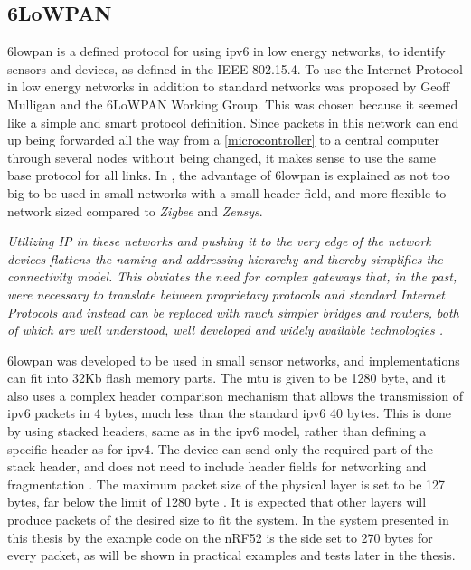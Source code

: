 
\subsection{6LoWPAN}

\gls{6lowpan} is a defined protocol for using \gls{ipv6} in low energy networks, to identify sensors and devices, as defined in the IEEE 802.15.4. To use the Internet Protocol in low energy networks in addition to standard networks was proposed by Geoff Mulligan and the 6LoWPAN Working Group. This was chosen because it seemed like a simple and smart protocol definition. Since packets in this network can end up being forwarded all the way from a \ref{microcontroller} to a central computer through several nodes without being changed, it makes sense to use the same base protocol for all links. In \cite{mulligan20076lowpan}, the advantage of \gls{6lowpan} is explained as not too big to be used in small networks with a small header field, and more flexible to network sized compared to \textit{Zigbee} and \textit{Zensys}. 

\noindent\textit{Utilizing IP  in these networks and pushing it to the very edge of the network devices flattens the naming and addressing hierarchy and  thereby  simplifies  the  connectivity  model. This obviates the need  for  complex  gateways  that,  in  the  past,  were  necessary  to translate   between   proprietary   protocols   and   standard   Internet Protocols and instead can be replaced with much simpler bridges and  routers,  both  of  which  are  well  understood, well  developed and  widely  available  technologies \cite{mulligan20076lowpan}.}


\gls{6lowpan} was developed to be used in small sensor networks, and implementations can fit into 32Kb flash memory parts. The \gls{mtu} is given to be 1280 byte, and it also uses a complex header comparison mechanism that allows the transmission of \gls{ipv6} packets in 4 bytes, much less than the standard \gls{ipv6} 40 bytes. This is done by using stacked headers, same as in the \gls{ipv6} model, rather than defining a specific header as for \gls{ipv4}. The device can send only the required part of the stack header, and does not need to include header fields for networking and fragmentation \cite{hui2008extending}. The maximum packet size of the physical layer is set to be 127 bytes, far below the limit of 1280 byte \cite{kushalnagar2007transmission}. It is expected that other layers will produce packets of the desired size to fit the system. In the system presented in this thesis by the example code on the nRF52 is the side set to 270 bytes for every packet, as will be shown in practical examples and tests later in the thesis. 
  

